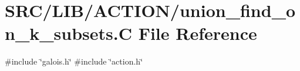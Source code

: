 \hypertarget{union__find__on__k__subsets_8_c}{}\section{S\+R\+C/\+L\+I\+B/\+A\+C\+T\+I\+O\+N/union\+\_\+find\+\_\+on\+\_\+k\+\_\+subsets.C File Reference}
\label{union__find__on__k__subsets_8_c}
{\ttfamily \#include \char`\"{}galois.\+h\char`\"{}}\newline
{\ttfamily \#include \char`\"{}action.\+h\char`\"{}}\newline
